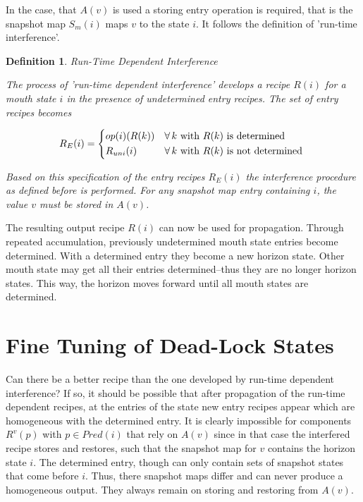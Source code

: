 \documentclass[12pt,a4paper]{scrartcl}
\newtheorem{definition}{Definition}
\begin{document}
In the case, that $A(v)$ is used a storing entry operation is required, that is
the snapshot map $S_m(i)$ maps $v$ to the state $i$. It follows the definition of
'run-time interference'.

\begin{definition}
Run-Time Dependent Interference

The process of 'run-time dependent interference' develops a recipe $R(i)$
for a mouth state $i$ in the presence of undetermined entry recipes. The
set of entry recipes becomes

\begin{equation}
    R_E(i) = \begin{dcases*}
            op(i)(R(k)) & $\forall\,k$ with $R(k)$ is determined \\
            R_{uni}(i)  & $\forall\,k$ with $R(k)$ is not determined
        \end{dcases*}
\end{equation}

Based on this specification of the entry recipes $R_E(i)$ the interference
procedure as defined before is performed. For any snapshot map entry
containing $i$, the value $v$ must be stored in $A(v)$.
\end{definition}

The resulting output recipe $R(i)$ can now be used for propagation. Through
repeated accumulation, previously undetermined mouth state entries become
determined. With a determined entry they become a new horizon state. Other
mouth state may get all their entries determined--thus they are no longer
horizon states. This way, the horizon moves forward until all mouth states are
determined. 

%
\section{Fine Tuning of Dead-Lock States}

Can there be a better recipe than the one developed by run-time dependent
interference? If so, it should be possible that after propagation of the
run-time dependent recipes, at the entries of the state new entry recipes
appear which are homogeneous with the determined entry. It is clearly
impossible for components $R^v(p)$ with $p \in Pred(i)$ that rely on
$A(v)$ since in that case the interfered recipe stores and restores, such that
the snapshot map for $v$ contains the horizon state $i$. The determined entry,
though can only contain sets of snapshot states that come before $i$. Thus,
there snapshot maps differ and can never produce a homogeneous output. They
always remain on storing and restoring from $A(v)$.
\end{document}
